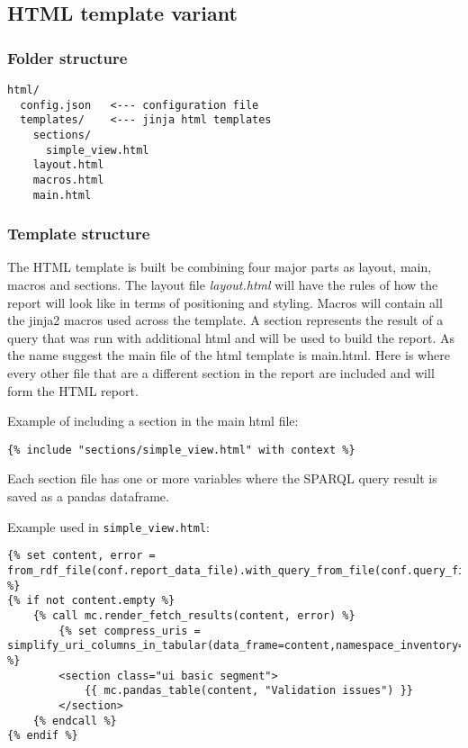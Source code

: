 \subsection{HTML template variant}
\subsubsection{Folder structure}
\begin{lstlisting}
html/
  config.json   <--- configuration file
  templates/    <--- jinja html templates
    sections/
      simple_view.html
    layout.html
    macros.html
    main.html
\end{lstlisting}


\subsubsection{Template structure}

The HTML template is built be combining four major parts as layout, main, macros and sections. The layout file \textit{layout.html} will have the rules of how the report will look like in terms of positioning and styling. Macros will contain all the jinja2 macros used across the template. A section represents the result of a query that was run with additional html and will be used to build the report. As the name suggest the main file of the html template is main.html. Here is where every other file that are a different section in the report are included and will form the HTML report.

Example of including a section in the main html file:
\begin{lstlisting}
{% include "sections/simple_view.html" with context %}
\end{lstlisting}

Each section file has one or more variables where the SPARQL query result is saved as a pandas dataframe.

Example used in \texttt{simple\_view.html}:
\begin{lstlisting}
{% set content, error = from_rdf_file(conf.report_data_file).with_query_from_file(conf.query_file).fetch_tabular() %}
{% if not content.empty %}
    {% call mc.render_fetch_results(content, error) %}
        {% set compress_uris = simplify_uri_columns_in_tabular(data_frame=content,namespace_inventory=namespaces,error_fail=False) %}
        <section class="ui basic segment">
            {{ mc.pandas_table(content, "Validation issues") }}
        </section>
    {% endcall %}
{% endif %}
\end{lstlisting}

